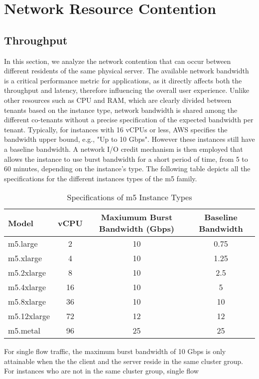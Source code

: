 \chapter{Network Resource Contention}\label{chapter:network}
\section{Throughput}
In this section, we analyze the network contention that can occur between different residents of the same 
physical server. The available network bandwidth is a critical performance metric for applications, as it 
directly affects both the throughput and latency, therefore influencing the overall user experience. 
Unlike other resources such as CPU and RAM, which are clearly divided between tenants based on the instance 
type, network bandwidth is shared among the different co-tenants without a precise specification of the 
expected bandwidth per tenant. Typically, for instances with 16 vCPUs or less, AWS specifies the bandwidth 
upper bound, e.g., "Up to 10 Gbps". However these instances still have a baseline bandwidth. 
A network I/O credit mechanism is then employed that allows the instance to use burst bandwidth for a 
short period of time, from 5 to 60 minutes, depending on the instance's type. The following table 
depicts all the specifications for the different instances types of the m5 family.
\begin{table}[H]
\centering
\begin{tabular}{lccc}
\toprule
\textbf{Model} & \textbf{vCPU} & \textbf{Maxiumum Burst Bandwidth (Gbps)} & \textbf{Baseline Bandwidth} \\
\midrule
m5.large     & 2  & 10 & 0.75\\
m5.xlarge    & 4  & 10 & 1.25\\
m5.2xlarge   & 8  & 10 & 2.5\\
m5.4xlarge   & 16 & 10 & 5\\
m5.8xlarge   & 36 & 10 & 10\\
m5.12xlarge  & 72 & 12 & 12\\
m5.metal     & 96 & 25 & 25 \\
\bottomrule
\end{tabular}
\caption{Specifications of m5 Instance Types}
\end{table}
\noindent
For single flow traffic, the maximum burst bandwidth of 10 Gbps is only attainable when the the client and 
the server reside in the same cluster group. For instances who are not in the same cluster group, single flow 
